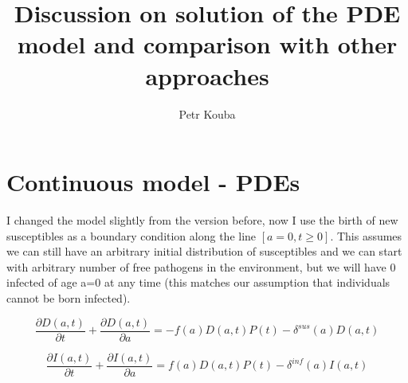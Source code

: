 \documentclass[10pt]{article}         %
\title{Discussion on solution of the PDE model and comparison with other approaches}
\author{Petr Kouba}
\begin{document}
\maketitle

\section{Continuous model - PDEs}
\label{continuous}

I changed the model slightly from the version before, now I use the birth of new susceptibles as a boundary condition along the line $[a=0, t \geq 0]$. This assumes we can still have an arbitrary initial distribution of susceptibles and we can start with arbitrary number of free pathogens in the environment, but we will have 0 infected of age a=0 at any time (this matches our assumption that individuals cannot be born infected).

\begin{equation}
\label{D_eq}
	\frac{\partial D(a,t)}{\partial t} + \frac{\partial D(a,t)}{\partial a}= - f(a)D(a,t)P(t) - \delta^{sus}(a)D(a,t)
\end{equation}

\begin{equation}
\label{I_eq}
	\frac{\partial I(a,t)}{\partial t} + \frac{\partial I(a,t)}{\partial a}= f(a)D(a,t)P(t) - \delta^{inf}(a)I(a,t)
\end{equation}
\end{document}

